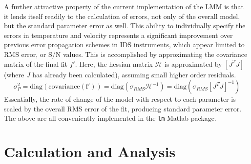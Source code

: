 \documentclass{AIAA}
\begin{document}
\hspace*{4ex}A further attractive property of the current implementation of the LMM is that it lends itself readily to the calculation of errors, not only of the overall model, but the standard parameter error as well. This ability to individually specify the errors in temperature and velocity represents a significant improvement over previous error propagation schemes in IDS instruments, which appear limited to RMS error, or S/N values. This is accomplished by approximating the covariance matrix of the final fit $f'$. Here, the hessian matrix $\mathcal{H}$ is approximated by $[J^TJ]$ (where $J$ has already been calculated), assuming small higher order residuals\cite{yuen2010bayesian}.
\begin{equation}
\sigma_P^2 =\mathrm{diag(covariance(f'))}= \mathrm{diag}(\sigma_{RMS}\mathcal{H}^{-1}) = \mathrm{diag}(\sigma_{RMS}[J^TJ]^{-1})
\end{equation}
Essentially, the rate of change of the model with respect to each parameter is scaled by the overall RMS error of the fit, producing standard parameter error. The above are all conveniently implemented in the \texttt{lm} Matlab package.

\section{Calculation and Analysis}\label{sec::Analysis}
\end{document}
